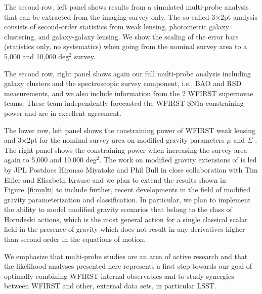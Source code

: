 The second row, left panel shows results from a simulated multi-probe analysis
that can be extracted from the imaging survey only. The so-called 3$\times$2pt analysis
consists of second-order statistics from weak lensing, photometric galaxy
clustering, and galaxy-galaxy lensing. We show the scaling of the error bars
(statistics only, no systematics) when going from the nominal survey area to a
5,000 and 10,000 deg$^2$ survey.

The second row, right panel shows again our full multi-probe analysis including
galaxy clusters and the spectroscopic survey component, i.e., BAO and RSD
measurements, and we also include information from the 2 WFIRST supernovae
teams. These team independently forecasted the WFIRST SN1a constraining power
and are in excellent agreement.

The lower row, left panel shows the constraining power of WFIRST weak lensing
and 3$\times$2pt for the nominal survey area on modified gravity parameters $\mu$ and
$\Sigma$ \citep[see e.g.,][for details]{jjk15, baa15}. The right panel shows the
constraining power when increasing the survey area again to 5,000 and 10,000
deg$^2$. The work on modified gravity extensions of \CoLi is led by JPL Postdocs Hironao Miyatake and Phil Bull in close collaboration with Tim Eifler and Elisabeth Krause and we plan to extend the results shown in Figure~\ref{fi:multi} to include further, recent developments in the field of modified gravity parameterization and classification. In particular, we plan to implement the ability to model modified gravity scenarios that belong to the class of Horndeski actions, which is the most general action for a single classical scalar field in the presence of gravity which does not result in any derivatives higher than second order in the equations of motion. 

We emphasize that multi-probe studies are an area of active research and that
the likelihood analyses presented here represents a first step towards our goal of optimally combining WFIRST internal observables and to study synergies between WFIRST and other, external data sets, in particular LSST\@.

